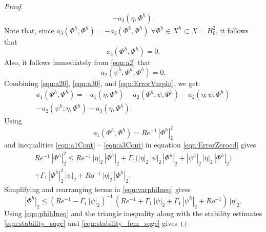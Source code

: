 \begin{proof}
\begin{equation}
\begin{split}
      -a_3(\eta,\Phi^h).
    \end{split}
    \label{eqn:ErrorVarphi}
  \end{equation}
  Note that, since $a_3(\Phi^h,\Phi^h)=-a_3(\Phi^h,\Phi^h)\; \forall
  \Phi^h \in X^h \subset X = H^2_0$, it follows that 
  \begin{equation}
    a_3(\Phi^h,\Phi^h)=0 .
    \label{eqn:a30}
  \end{equation}
  Also, it follows immediately from \eqref{eqn:a2} that
  \begin{equation}
    a_2(\psi^h,\Phi^h,\Phi^h)=0 .
    \label{eqn:a20}
  \end{equation}
  Combining \eqref{eqn:a20}, \eqref{eqn:a30}, and \eqref{eqn:ErrorVarphi}, we get:
  \begin{equation}
    \begin{split}
      a_1(\Phi^h,\Phi^h) = -a_1(\eta,\Phi^h)
      - a_2(\Phi^h;\psi,\Phi^h) - a_2(\eta;\psi,\Phi^h) \\
      - a_2(\psi^h;\eta,\Phi^h) - a_3(\eta,\Phi^h).
    \end{split}
    \label{eqn:ErrorZeroed}
  \end{equation}
  Using
  \begin{equation*}
    a_1(\Phi^h,\Phi^h) = Re^{-1} \, |\Phi^h|^2_2
  \end{equation*}
  and inequalities \eqref{eqn:a1Cont} -- \eqref{eqn:a3Cont} in equation
  \eqref{eqn:ErrorZeroed} gives
  \begin{equation}
    \begin{split}
      Re^{-1} \, |\Phi^h|^2_2 \le Re^{-1} \,  |\eta|_2 \, |\Phi^h|_2 + \Gamma_1
      \biggl( |\eta|_2 \, |\psi|_2 \, |\Phi^h|_2 + |\psi^h|_2 \, |\eta|_2 \, |\Phi^h|_2 \biggr) \\ 
      + \Gamma_1 \, |\Phi^h|^2_2 \, |\psi|_2 + Ro^{-1} \, |\eta|_2 \, |\Phi^h|_2 .
    \end{split}
    \label{eqn:varphiIneq}
  \end{equation}
  Simplifying and rearranging terms in \eqref{eqn:varphiIneq} gives
  \begin{equation}
      |\Phi^h|_2 
      \le 
      \left(
      Re^{-1}
      - \Gamma_1 \, | \psi |_2
      \right)^{-1} \, 
      \left(
      Re^{-1} 
      + \Gamma_1 \, |\psi|_2 
      + \Gamma_1 \, |\psi^h|_2 
      + Ro^{-1} 
      \right) \,  
      |\eta|_2 .
    \label{eqn:phihIneq}
  \end{equation}
  Using \eqref{eqn:phihIneq} and the triangle inequality along with the stability estimates \eqref{eqn:stability_sqge} and \eqref{eqn:stability_fem_sqge} gives

\end{proof}
